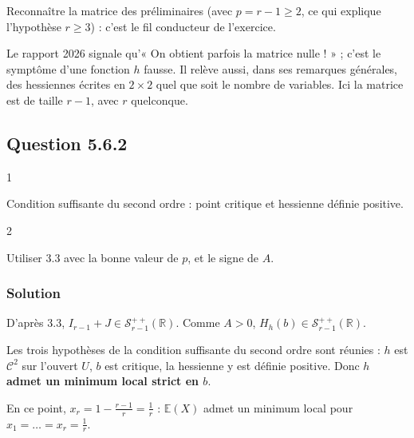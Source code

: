 \documentclass[11pt,a4paper]{article}
\begin{document}
\begin{methode}

Reconnaître la matrice des préliminaires (avec \(p=r-1\ge2\), ce qui explique l'hypothèse \(r\ge3\)) : c'est le fil conducteur de l'exercice.

\end{methode}

\begin{piege}

Le rapport 2026 signale qu'« On obtient parfois la matrice nulle ! » ; c'est le symptôme d'une fonction \(h\) fausse. Il relève aussi, dans ses remarques générales, des hessiennes écrites en \(2\times2\) quel que soit le nombre de variables. Ici la matrice est de taille \(r-1\), avec \(r\) quelconque.

\end{piege}

\hypertarget{question-5.6.2}{%
\subsection{Question 5.6.2}\label{question-5.6.2}}

\begin{indication}{1}

Condition suffisante du second ordre : point critique et hessienne définie positive.

\end{indication}

\begin{indication}{2}

Utiliser 3.3 avec la bonne valeur de \(p\), et le signe de \(A\).

\end{indication}

\hypertarget{solution-15}{%
\subsubsection{Solution}\label{solution-15}}

D'après 3.3, \(I_{r-1}+J\in\mathcal S^{++}_{r-1}(\mathbb R)\). Comme \(A>0\), \(H_h(b)\in\mathcal S^{++}_{r-1}(\mathbb R)\).

Les trois hypothèses de la condition suffisante du second ordre sont réunies : \(h\) est \(\mathcal C^2\) sur l'ouvert \(U\), \(b\) est critique, la hessienne y est définie positive. Donc \textbf{\(h\) admet un minimum local strict en \(b\)}.

En ce point, \(x_r=1-\frac{r-1}r=\frac1r\) : \(\mathbb E(X)\) admet un minimum local pour \(x_1=\dots=x_r=\frac1r\).
\end{document}

